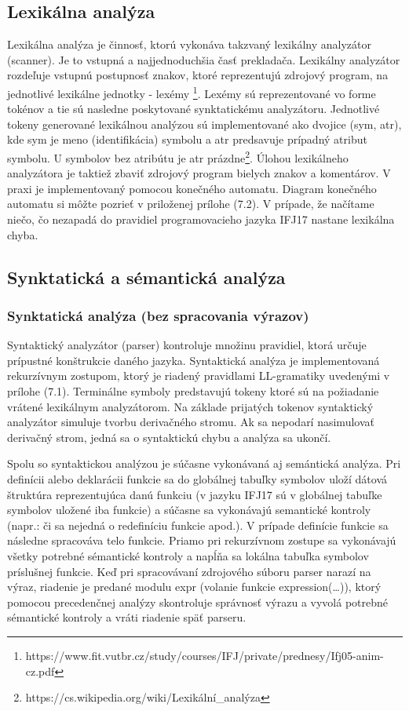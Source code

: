\documentclass[11pt,a4paper]{article}
\begin{document}
	\subsection{Lexikálna analýza}

	Lexikálna analýza je činnosť, ktorú vykonáva takzvaný lexikálny analyzátor (scanner). Je to vstupná a najjednoduchšia časť prekladača. Lexikálny analyzátor rozdeľuje vstupnú postupnosť znakov, ktoré reprezentujú zdrojový program, na jednotlivé lexikálne jednotky - lexémy \footnote{https://www.fit.vutbr.cz/study/courses/IFJ/private/prednesy/Ifj05-anim-cz.pdf}. Lexémy sú reprezentované vo forme tokénov a tie sú nasledne poskytované synktatickému analyzátoru. Jednotlivé tokeny generované lexikálnou analýzou sú implementované ako dvojice (sym, atr), kde sym je meno (identifikácia) symbolu a atr predsavuje prípadný atribut symbolu. U symbolov bez atribútu je atr prázdne\footnote{https://cs.wikipedia.org/wiki/Lexikální\_analýza}. Úlohou lexikálneho analyzátora je taktiež zbaviť zdrojový program bielych znakov a komentárov. V praxi je implementovaný pomocou konečného automatu. Diagram konečného automatu si môžte pozrieť v priloženej prílohe (7.2). V prípade, že načítame niečo, čo nezapadá do pravidiel programovacieho jazyka IFJ17 nastane lexikálna chyba.

	\subsection{Synktatická a sémantická analýza}
		\subsubsection{Synktatická analýza (bez spracovania výrazov)}

		Syntaktický analyzátor (parser) kontroluje množinu pravidiel, ktorá určuje prípustné konštrukcie daného jazyka. Syntaktická analýza je 
		implementovaná rekurzívnym zostupom, ktorý je riadený pravidlami LL-gramatiky uvedenými v prílohe (7.1). Terminálne symboly predstavujú 
		tokeny ktoré sú na požiadanie vrátené lexikálnym analyzátorom. Na základe prijatých tokenov syntaktický analyzátor simuluje tvorbu 
		derivačného stromu. Ak sa nepodarí nasimulovať derivačný strom, jedná sa o syntaktickú chybu a analýza sa ukončí.

		Spolu so syntaktickou analýzou je súčasne vykonávaná aj semántická analýza. Pri definícii alebo deklarácii funkcie sa do globálnej tabuľky 
		symbolov uloží dátová štruktúra reprezentujúca danú funkciu (v jazyku IFJ17 sú v globálnej tabuľke symbolov uložené iba funkcie) a súčasne 
		sa vykonávajú semantické kontroly (napr.: či sa nejedná o redefiníciu funkcie apod.). V prípade definície funkcie sa následne spracováva 
		telo funkcie. Priamo pri rekurzívnom zostupe sa vykonávajú všetky potrebné sémantické kontroly a napĺňa sa lokálna tabuľka symbolov príslušnej funkcie. 
		Keď pri spracovávaní zdrojového súboru parser narazí na výraz, riadenie je predané modulu expr (volanie funkcie expression(\dots)), ktorý 
		pomocou precedenčnej analýzy skontroluje správnosť výrazu a vyvolá potrebné sémantické kontroly a vráti riadenie späť parseru.
\end{document}
